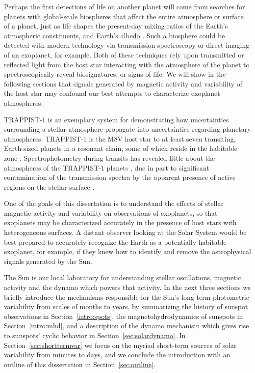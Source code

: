 Perhaps the first detections of life on another planet will come from searches for planets with global-scale biospheres that affect the entire atmosphere or surface of a planet, just as life shapes the present-day mixing ratios of the Earth's atmospheric constituents, and Earth's albedo \citep{Sagan1993}. Such a biosphere could be detected with modern technology via transmission spectroscopy or direct imaging of an exoplanet, for example. Both of these techniques rely upon transmitted or reflected light from the host star interacting with the atmosphere of the planet to spectroscopically reveal biosignatures, or signs of life. We will show in the following sections that signals generated by magnetic activity and variability of the host star may confound our best attempts to characterize exoplanet atmospheres. 

TRAPPIST-1 is an exemplary system for demonstrating how uncertainties surrounding a stellar atmosphere propagate into uncertainties regarding planetary atmospheres. TRAPPIST-1 is the M8V host star to at least seven transiting, Earth-sized planets in a resonant chain, some of which reside in the habitable zone \citep{Gillon2016,Gillon2017,Luger2017}. Spectrophotometry during transits has revealed little about the atmospheres of the TRAPPIST-1 planets \citep{deWit2016, Ducrot2018}, due in part to significant contamination of the transmission spectra by the apparent presence of active regions on the stellar surface \citep{Morris2018c, Zhang2018, Wakeford2019}. 

One of the goals of this dissertation is to understand the effects of stellar magnetic activity and variability on observations of exoplanets, so that exoplanets may be characterized accurately in the presence of host stars with heterogeneous surfaces. A distant observer looking at the Solar System would be best prepared to accurately recognize the Earth as a potentially habitable exoplanet, for example, if they knew how to identify and remove the astrophysical signals generated by the Sun. 

The Sun is our local laboratory for understanding stellar oscillations, magnetic activity and the dynamo which powers that activity. In the next three sections we briefly introduce the mechanisms responsible for the Sun's long-term photometric variability from scales of months to years, by summarizing the history of sunspot observations in Section~\ref{intro:spots}, the magnetohydrodynamics of sunspots in Section~\ref{intro:mhd}, and a description of the dynamo mechanism which gives rise to sunspots' cyclic behavior in Section~\ref{sec:solardynamo}. In Section~\ref{sec:shorttermvar} we focus on the myriad short-term sources of solar variability from minutes to days, and we conclude the introduction with an outline of this dissertation in Section~\ref{sec:outline}.

